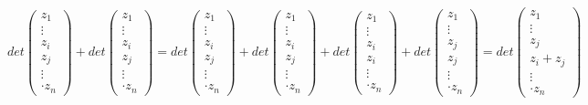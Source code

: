 \documentclass{article} %
\begin{document}
\begin{equation*}
     det \begin{pmatrix}
 z_1 \\
\vdots \\
z_i \\
z_j \\
\vdots \\
 \cdot z_n
\end{pmatrix} + det \begin{pmatrix}
 z_1 \\
\vdots \\
z_i \\
z_j \\
\vdots \\
 \cdot z_n
 \end{pmatrix}  =  det \begin{pmatrix}
 z_1 \\
\vdots \\
z_i \\
z_j \\
\vdots \\
 \cdot z_n
\end{pmatrix} + det \begin{pmatrix}
 z_1 \\
\vdots \\
z_i \\
z_j \\
\vdots \\
 \cdot z_n
 \end{pmatrix} + det \begin{pmatrix}
 z_1 \\
\vdots \\
z_i \\
z_i \\
\vdots \\
 \cdot z_n
 \end{pmatrix}
 + det \begin{pmatrix}
 z_1 \\
\vdots \\
z_j \\
z_j \\
\vdots \\
 \cdot z_n
 \end{pmatrix} = 
 det \begin{pmatrix}
 z_1 \\
\vdots \\
z_j \\
z_i + z_j \\
\vdots \\
 \cdot z_n

\end{pmatrix}
\end{equation*}
\end{document}
